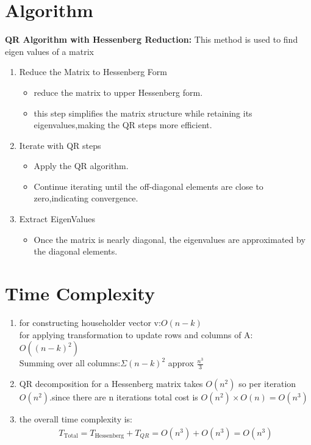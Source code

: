 \documentclass[journal]{IEEEtran}
\begin{document}
\section{\textbf{Algorithm}}
    \textbf{QR Algorithm with Hessenberg Reduction:} 
    This method is used to find eigen values of a matrix 
    \begin{enumerate}
        \item Reduce the Matrix to Hessenberg Form
        \begin{itemize}
            \item reduce the matrix to upper Hessenberg form.
            \item this step simplifies the matrix structure while retaining its eigenvalues,making the QR steps more efficient.
        \end{itemize}
        \item Iterate with QR steps 
        \begin{itemize}
            \item Apply the QR algorithm.
            \item Continue iterating until the off-diagonal elements are close to zero,indicating convergence. 
        \end{itemize}
        \item Extract EigenValues
        \begin{itemize}
            \item Once the matrix is nearly diagonal, the eigenvalues are approximated by the diagonal elements.
        \end{itemize}
    \end{enumerate}


\section{\textbf{Time Complexity}}
    \begin{enumerate}
        \item for constructing householder vector v:$O(n-k)$\\
        for applying transformation to update rows and columns of A:$O((n-k)^2)$\\
        Summing over all columns:$\Sigma(n-k)^2$ approx $\frac{n^3}{3}$
        \item QR decomposition for a Hessenberg matrix takes $O(n^2)$
        so per iteration $O(n^2)$.since there are n iterations total cost is $O(n^2)\times O(n) = O(n^3)$
        \item the overall time complexity is: 
        \begin{align*}
        T_\text{Total} = T_\text{Hessenberg} + T_{QR} = O(n^3) + O(n^3) = O(n^3)
         \end{align*}
    \end{enumerate}
\end{document}
